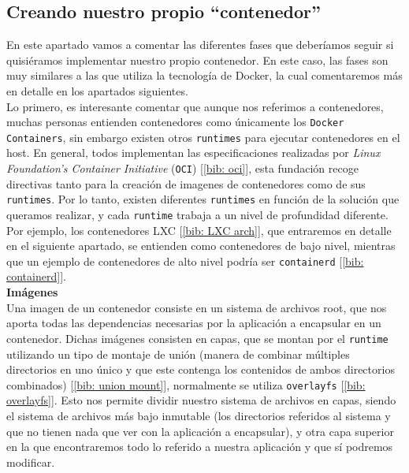 \documentclass[12pt]{article}
\begin{document}
	\pagebreak
	
	\subsection{Creando nuestro propio ``contenedor''}
	\noindent En este apartado vamos a comentar las diferentes fases que deberíamos seguir si quisiéramos implementar nuestro propio contenedor. En este caso, las fases son muy similares a las que utiliza la tecnología de Docker, la cual comentaremos más en detalle en los apartados siguientes. \\
	
	\noindent Lo primero, es interesante comentar que aunque nos referimos a contenedores, muchas personas entienden contenedores como únicamente los \texttt{Docker Containers}, sin embargo existen otros \texttt{runtimes} para ejecutar contenedores en el host. En general, todos implementan las especificaciones realizadas por \textit{Linux Foundation's Container Initiative} (\texttt{OCI}) [\ref{bib: oci}], esta fundación recoge directivas tanto para la creación de imagenes de contenedores como de sus \texttt{runtimes}. Por lo tanto, existen diferentes \texttt{runtimes} en función de la solución que queramos realizar, y cada \texttt{runtime} trabaja a un nivel de profundidad diferente. Por ejemplo, los contenedores LXC [\ref{bib: LXC arch}], que entraremos en detalle en el siguiente apartado, se entienden como contenedores de bajo nivel, mientras que un ejemplo de contenedores de alto nivel podría ser \texttt{containerd} [\ref{bib: containerd}]. \\
	
	\noindent \textbf{\large Imágenes}\\
	
	\noindent Una imagen de un contenedor consiste en un sistema de archivos root, que nos aporta todas las dependencias necesarias por la aplicación a encapsular en un contenedor. Dichas imágenes consisten en capas, que se montan por el \texttt{runtime} utilizando un tipo de montaje de unión (manera de combinar múltiples directorios en uno único y que este contenga los contenidos de ambos directorios combinados) [\ref{bib: union mount}], normalmente se utiliza \texttt{overlayfs} [\ref{bib: overlayfs}]. Esto nos permite dividir nuestro sistema de archivos en capas, siendo el sistema de archivos más bajo inmutable (los directorios referidos al sistema y que no tienen nada que ver con la aplicación a encapsular), y otra capa superior en la que encontraremos todo lo referido a nuestra aplicación y que sí podremos modificar. \\
	
\end{document}
